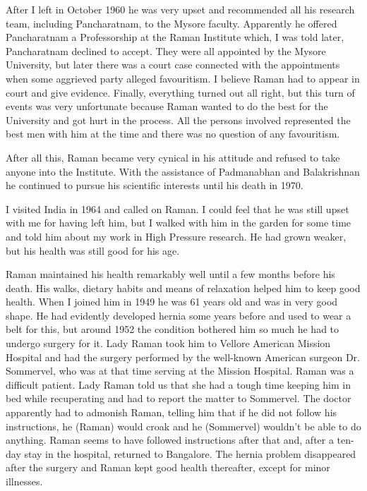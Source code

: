 After I left in October 1960 he was very upset and
recommended all his research team, including Pancharatnam, to
the Mysore faculty. Apparently he offered Pancharatnam a
Professorship at the Raman Institute which, I was told later,
Pancharatnam declined to accept. They were all appointed by
the Mysore University, but later there was a court case connected
with the appointments when some aggrieved party alleged
favouritism. I believe Raman had to appear in court and give
evidence. Finally, everything turned out all right, but this turn
of events was very unfortunate because Raman wanted to do the
best for the University and got hurt in the process. All the persons
involved represented the best men with him at the time and there
was no question of any favouritism.

After all this, Raman became very cynical in his attitude and
refused to take anyone into the Institute. With the assistance of
\hbox{Padmanabhan} and Balakrishnan he continued to pursue his
scientific interests until his death in 1970.

I visited India in 1964 and called on Raman. I could feel
that he was still upset with me for having left him, but I walked
with him in the garden for some time and told him about my
work in High Pressure research. He had grown weaker, but his
health was still good for his age.

Raman maintained his health remarkably well until a few
months before his death. His walks, dietary habits and means
of relaxation helped him to keep good health. When I joined him
in 1949 he was 61 years old and was in very good shape. He had
evidently developed hernia some years before and used to wear
a belt for this, but around 1952 the condition bothered him so
much he had to undergo surgery for it. Lady Raman took him
to Vellore American Mission Hospital and had the surgery
performed by the well-known American surgeon Dr. Sommervel,
who was at that time serving at the Mission Hospital. Raman
was a difficult patient. Lady Raman told us that she had a tough
time keeping him in bed while recuperating and had to report
the matter to Sommervel. The doctor apparently had to admonish
Raman, telling him that if he did not follow his instructions,
he (Raman) would croak and he (Sommervel) wouldn't be able
to do anything. Raman seems to have followed instructions after
that and, after a ten-day stay in the hospital, returned to
Bangalore. The hernia problem disappeared after the surgery and
Raman kept good health thereafter, except for minor illnesses.


